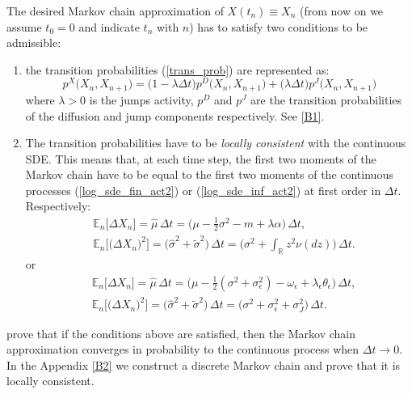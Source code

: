 The desired Markov chain approximation of $X(t_n) \equiv X_n$ (from now on we assume $t_0 = 0$ and indicate $t_n$ with $n$) has to satisfy two conditions to be admissible: 
\begin{enumerate}
 \item the transition probabilities (\ref{trans_prob}) are represented as:
 \begin{equation}
  p^X \bigl(X_n,X_{n+1}\bigr) = \bigl(1-\lambda \Delta t \bigr) p^{D}\bigl(X_n,X_{n+1}\bigr) + \bigl( \lambda \Delta t \bigr) p^J\bigl(X_n,X_{n+1}\bigr)
 \end{equation}
  where $\lambda > 0$ is the jumps activity, $p^{D}$ and $p^J$ are the transition probabilities of the diffusion and jump components respectively. See \ref{B1}.
 \item The transition probabilities have to be \emph{locally consistent} with the continuous SDE. 
 This means that, at each time step, the first two moments of the Markov chain have to be equal to the first two moments of the continuous processes (\ref{log_sde_fin_act2}) or
 (\ref{log_sde_inf_act2}) at first order in $\Delta t$. Respectively:
\begin{align}\label{loc1}
 & \mathbb{E}_n \bigl[ \Delta X_n \bigr] = \hat \mu \, \Delta t = \biggl( \mu - \frac{1}{2}\sigma^2 -m + \lambda \alpha \biggr)\, \Delta t,\\ \nonumber
 & \mathbb{E}_n \biggl[ \bigl( \Delta X_n \bigr)^2 \biggr] = \bigl( \hat \sigma^2 + \tilde \sigma^2\bigr) \, \Delta t = 
 \biggl( \sigma^2 + \int_{\mathbb{R}} z^2 \nu(dz) \biggr) \, \Delta t.
\end{align}
or
\begin{align}\label{loc2}
 & \mathbb{E}_n \bigl[ \Delta X_n \bigr] = \hat \mu \, \Delta t  
 = \biggl( \mu - \frac{1}{2} (\sigma^2 + \sigma_{\epsilon}^2) - \omega_{\epsilon} + \lambda_{\epsilon} \theta_{\epsilon}  \biggr) \, \Delta t,\\ \nonumber
 & \mathbb{E}_n \biggl[ \bigl( \Delta X_n \bigr)^2 \biggr] = \bigl( \hat \sigma^2 + \tilde \sigma^2\bigr) \, \Delta t = 
 \biggl( \sigma^2 + \sigma_{\epsilon}^2 + \sigma_J^2 \biggr) \, \Delta t.
\end{align}
\end{enumerate}
\cite{Kushner} prove that if the conditions above are satisfied, then the Markov chain approximation converges in probability to the continuous process when $\Delta t \to 0$. 
In the Appendix \ref{B2} we construct a discrete Markov chain and prove that it is locally consistent.


